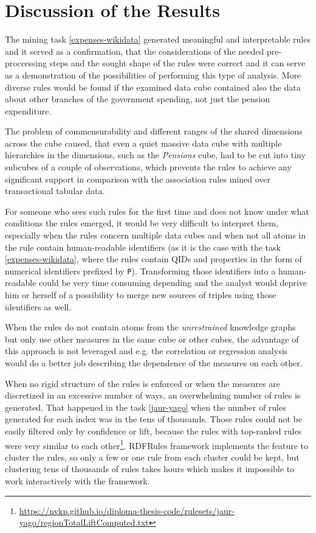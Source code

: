 \chapter{Discussion of the Results\label{discussion}}

The mining task \ref{expenses-wikidata} generated meaningful and interpretable rules and it served as a confirmation, that the considerations of the needed pre-proccessing steps and the sought shape of the rules were correct and it can serve as a demonstration of the possibilities of performing this type of analysis. More diverse rules would be found if the examined data cube contained also the data about other branches of the government spending, not just the pension expenditure.

The problem of commensurability and different ranges of the shared dimensions across the cube caused, that even a quiet massive data cube with multiple hierarchies in the dimensions, such as the \textit{Pensions} cube, had to be cut into tiny subcubes of a couple of observations, which prevents the rules to achieve any significant support in comparison with the association rules mined over transactional tabular data.

For someone who sees such rules for the first time and does not know under what conditions the rules emerged, it would be very difficult to interpret them, especially when the rules concern multiple data cubes and when not all atoms in the rule contain human-readable identifiers (as it is the case with the task \ref{expenses-wikidata}, where the rules contain QIDs and properties in the form of numerical identifiers prefixed by \verb|P|). Transforming those identifiers into a human-readable could be very time consuming depending and the analyst would deprive him or herself of a possibility to merge new sources of triples using those identifiers as well. 

When the rules do not contain atoms from the \textit{unrestrained} knowledge graphs but only use other measures in the same cube or other cubes, the advantage of this approach is not leveraged and e.g. the correlation or regression analysis would do a better job describing the dependence of the measures on each other. 

When no rigid structure of the rules is enforced or when the measures are discretized in an excessive number of ways, an overwhelming number of rules is generated. That happened in the task \ref{jaur-yago} when the number of rules generated for each index was in the tens of thousands. Those rules could not be easily filtered only by confidence or lift, because the rules with top-ranked rules were very similar to each other\footnote{\href{https://nvkp.github.io/diploma-thesis-code/rulesets/jaur-yago/regionTotalLiftComputed.txt}{https://nvkp.github.io/diploma-thesis-code/rulesets/jaur-yago/regionTotalLiftComputed.txt}}. RDFRules framework implements the feature to cluster the rules, so only a few or one rule from each cluster could be kept, but clustering tens of thousands of rules takes hours which makes it impossible to work interactively with the framework. 

